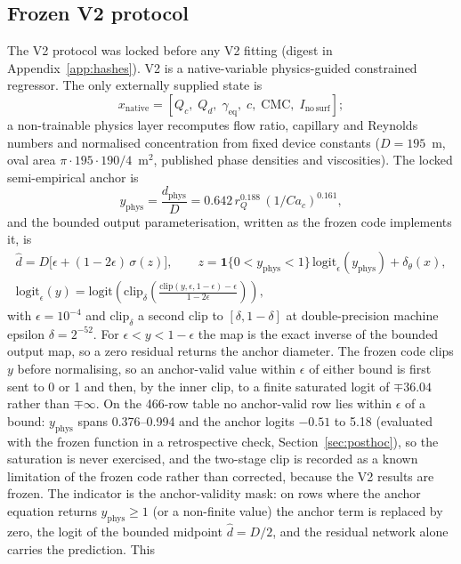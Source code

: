 \documentclass[11pt,a4paper]{article}
\newcommand{\um}{\textmu m}
\begin{document}
\subsection{Frozen V2 protocol}
\label{sec:v2protocol}
The V2 protocol was locked before any V2 fitting (digest in
Appendix~\ref{app:hashes}). V2 is a native-variable physics-guided
constrained regressor. The only externally supplied state is
\[
x_{\mathrm{native}}=[Q_c,\;Q_d,\;\gamma_{\mathrm{eq}},\;c,\;\mathrm{CMC},\;I_{\mathrm{no\,surf}}];
\]
a non-trainable physics layer recomputes flow ratio, capillary and Reynolds
numbers and normalised concentration from fixed device constants
($D=195$~\um, oval area $\pi\cdot195\cdot190/4$~\um$^2$, published phase
densities and viscosities). The locked semi-empirical anchor is
\[
y_{\mathrm{phys}} = \frac{d_{\mathrm{phys}}}{D} = 0.642\, r_Q^{0.188}\,(1/Ca_c)^{0.161},
\]
and the bounded output parameterisation, written as the frozen code
implements it, is
\begin{gather*}
\hat d = D\bigl[\epsilon + (1-2\epsilon)\,\sigma(z)\bigr],
\qquad
z = \mathbf{1}\{0<y_{\mathrm{phys}}<1\}\,\mathrm{logit}_\epsilon(y_{\mathrm{phys}}) + \delta_\theta(x),\\
\mathrm{logit}_\epsilon(y) = \mathrm{logit}\!\left(\mathrm{clip}_\delta\!\left(\frac{\mathrm{clip}(y,\epsilon,1-\epsilon)-\epsilon}{1-2\epsilon}\right)\right),
\end{gather*}
with $\epsilon=10^{-4}$ and $\mathrm{clip}_\delta$ a second clip to
$[\delta,1-\delta]$ at double-precision machine epsilon $\delta=2^{-52}$.
For $\epsilon<y<1-\epsilon$ the map is the exact inverse of the bounded
output map, so a zero residual returns the anchor diameter. The frozen code
clips $y$ before normalising, so an anchor-valid value within $\epsilon$ of
either bound is first sent to 0 or 1 and then, by the inner clip, to a finite
saturated logit of $\mp 36.04$ rather than $\mp\infty$. On the 466-row table
no anchor-valid row lies within $\epsilon$ of a bound: $y_{\mathrm{phys}}$
spans 0.376--0.994 and the anchor logits $-0.51$ to 5.18 (evaluated with the
frozen function in a retrospective check, Section~\ref{sec:posthoc}), so the
saturation is never exercised, and the two-stage clip is recorded as a known
limitation of the frozen code rather than corrected, because the V2 results
are frozen. The indicator is the anchor-validity mask: on rows where the
anchor equation returns $y_{\mathrm{phys}}\ge 1$ (or a non-finite value) the
anchor term is replaced by zero, the logit of the bounded midpoint
$\hat d=D/2$, and the residual network alone carries the prediction. This
\end{document}
